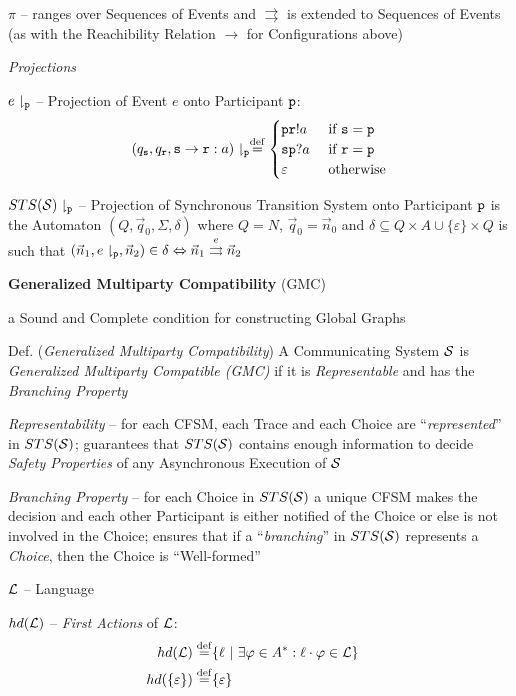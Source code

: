 $\pi$ -- ranges over Sequences of Events and $\rightrightarrows$ is
extended to Sequences of Events (as with the Reachibility Relation
$\rightarrow$ for Configurations above)


\emph{Projections}

$e\downharpoonright_\mathtt{p}$ -- Projection of Event $e$ onto
Participant $\mathtt{p}$:
\[
  (q_\mathtt{s},q_\mathtt{r},\mathtt{s}\rightarrow\mathtt{r}:a)
    \downharpoonright_\mathtt{p}
  \stackrel{\mathrm{def}}= \begin{cases}
    \mathtt{pr}!a &\ \text{if}\ \mathtt{s = p} \\
    \mathtt{sp}?a &\ \text{if}\ \mathtt{r = p} \\
    \varepsilon  &\ \text{otherwise} \\
  \end{cases}
\]

$STS(\mathcal{S})\downharpoonright_\mathtt{p}$ -- Projection of
Synchronous Transition System onto Participant $\mathtt{p}$ is the
Automaton $(Q, \vec{q}_0, \Sigma, \delta)$ where $Q = N$, $\vec{q}_0 =
\vec{n}_0$ and $\delta \subseteq Q \times A \cup \{\varepsilon\}
\times Q$ is such that $(\vec{n}_1, e\downharpoonright_\mathtt{p},
\vec{n}_2) \in \delta \Leftrightarrow \vec{n}_1
\stackrel{e}{\rightrightarrows} \vec{n}_2$


\textbf{Generalized Multiparty Compatibility} (GMC)

a Sound and Complete condition for constructing Global Graphs

Def. (\emph{Generalized Multiparty Compatibility}) A Communicating
System $\mathcal{S}$ is \emph{Generalized Multiparty Compatible (GMC)}
if it is \emph{Representable} and has the \emph{Branching Property}

\emph{Representability} -- for each CFSM, each Trace and each Choice
are ``\emph{represented}'' in $STS(\mathcal{S})$; guarantees that
$STS(\mathcal{S})$ contains enough information to decide \emph{Safety
  Properties} of any Asynchronous Execution of $\mathcal{S}$

\emph{Branching Property} -- for each Choice in $STS(\mathcal{S})$ a
unique CFSM makes the decision and each other Participant is either
notified of the Choice or else is not involved in the Choice; ensures
that if a ``\emph{branching}'' in $STS(\mathcal{S})$ represents a
\emph{Choice}, then the Choice is ``Well-formed''


$\mathcal{L}$ -- Language

$hd(\mathcal{L})$ -- \emph{First Actions} of $\mathcal{L}$:
\begin{align*}
  hd(\mathcal{L}) \stackrel{\mathrm{def}}=& \{ \ell \ |\ \exists\varphi \in A^*
    : \ell\cdot\varphi \in \mathcal{L} \} & \\
  hd(\{\varepsilon\}) \stackrel{\mathrm{def}}=& \{ \varepsilon \} &
\end{align*}

